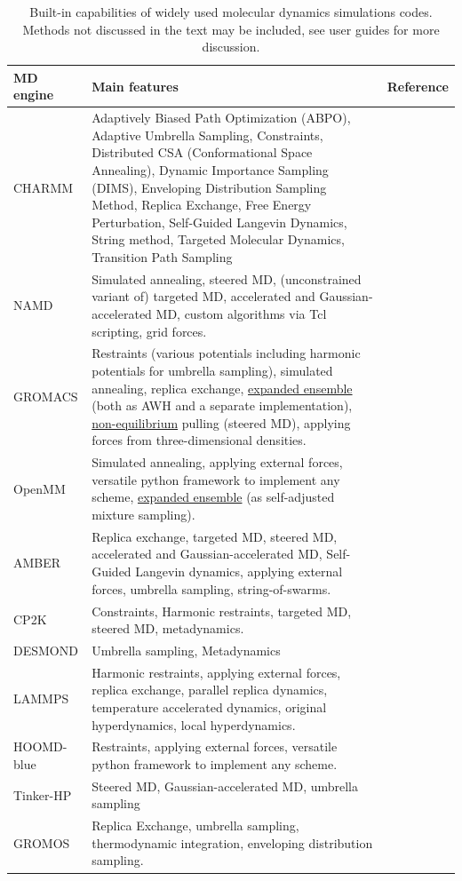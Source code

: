 \documentclass[9pt,review]{livecoms}
\begin{document}
\begin{table}[!ht]
\caption {Built-in capabilities of widely used molecular dynamics simulations codes. Methods not discussed in the text may be included, see user guides for more discussion.}
\label{Table:Codes}
\begin{tabularx}{0.95\textwidth}{
  || >{\raggedright\arraybackslash} l
  || >{\raggedright\arraybackslash}X
  | >{\raggedright\arraybackslash}l ||}
 \hline
  MD engine  & Main features                                 & Reference \\
\hline
\hline
CHARMM & Adaptively Biased Path Optimization (ABPO), Adaptive Umbrella Sampling, Constraints, Distributed CSA (Conformational Space Annealing), Dynamic Importance Sampling (DIMS), Enveloping Distribution Sampling Method, Replica Exchange, Free Energy Perturbation, Self-Guided Langevin Dynamics, String method, Targeted Molecular Dynamics, Transition Path Sampling & \cite{Brooks2009} \\
\hline
NAMD &  Simulated annealing, steered MD, (unconstrained variant of) targeted MD, accelerated and Gaussian-accelerated MD, custom algorithms via Tcl scripting, grid forces.        & \cite{Phillips2020} \\
\hline
GROMACS & Restraints (various potentials including harmonic potentials for umbrella sampling), simulated annealing, replica exchange, \hyperlink{ref:ExpEns} {expanded ensemble} (both as AWH and a separate implementation), \hyperlink{ref:OutOfEq} {non-equilibrium} pulling (steered MD), applying forces from three-dimensional densities.   &  \cite{lindahl_2021}\\
\hline
OpenMM & Simulated annealing, applying external forces, versatile python framework to implement any scheme, \hyperlink{ref:ExpEns}{expanded ensemble} (as self-adjusted mixture sampling). & \cite{10.1371/journal.pcbi.1005659}\\
\hline
AMBER  &  Replica exchange, targeted MD, steered MD, accelerated and Gaussian-accelerated MD, Self-Guided Langevin dynamics, applying external forces, umbrella sampling, string-of-swarms. & \cite{Case_2021} \\
\hline
CP2K & Constraints, Harmonic restraints, targeted MD, steered MD, metadynamics. & \cite{CP2K_2020} \\
\hline
DESMOND & Umbrella sampling, Metadynamics & \cite{Desmond2006} \\
\hline
LAMMPS  & Harmonic restraints, applying external forces, replica exchange, parallel replica dynamics, temperature accelerated dynamics, original hyperdynamics, local hyperdynamics. &  \cite{LAMMPS_2022}\\
\hline
HOOMD-blue &  Restraints, applying external forces, versatile python framework to implement any scheme. & \cite{HOOMD-blue_2020} \\
\hline
Tinker-HP & Steered MD, Gaussian-accelerated MD, umbrella sampling & \cite{Celerse2019,Celerse2021} \\
\hline
GROMOS & Replica Exchange, umbrella sampling, thermodynamic integration, enveloping distribution sampling.  & \cite{Gromos_2012} \\
\hline
\end{tabularx}
\end{table}
\end{document}
